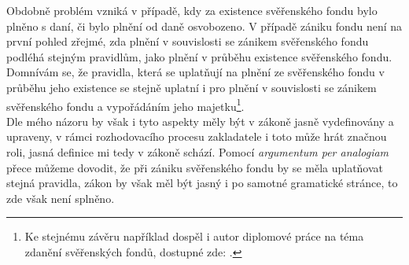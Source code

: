 \documentclass{article}
\begin{document}
Obdobně problém vzniká v případě, kdy za existence svěřenského fondu bylo plněno s daní, či bylo plnění od daně osvobozeno. V případě zániku fondu není na první pohled zřejmé, zda plnění v souvislosti se zánikem svěřenského fondu podléhá stejným pravidlům, jako plnění v průběhu existence svěřenského fondu.\\

Domnívám se, že pravidla, která se uplatňují na plnění ze svěřenského fondu v průběhu jeho existence se stejně uplatní i pro plnění v souvislosti se zánikem svěřenského fondu a vypořádáním jeho majetku\footnote{Ke stejnému závěru například dospěl i autor diplomové práce na téma zdanění svěřenských fondů, dostupné zde: .}.\\

Dle mého názoru by však i tyto aspekty měly být v zákoně jasně vydefinovány a upraveny, v rámci rozhodovacího procesu zakladatele i toto může hrát značnou roli, jasná definice mi tedy v zákoně schází. Pomocí \textit{argumentum per analogiam} přece můžeme dovodit, že při zániku svěřenského fondu by se měla uplatňovat stejná pravidla, zákon by však měl být jasný i po samotné gramatické stránce, to zde však není splněno.\\


 
\end{document}
